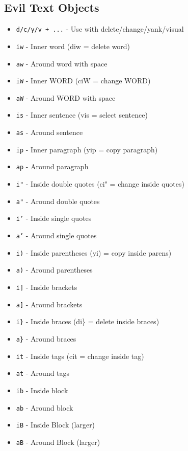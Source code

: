 \documentclass[6pt,landscape]{article}
\newcommand{\key}[1]{\texttt{#1}}
\begin{document}
\begin{multicols*}{5}
\section*{Evil Text Objects}
\begin{itemize}[leftmargin=*,itemsep=0pt,parsep=0pt,topsep=0pt]
\item \key{d/c/y/v + ...} - Use with delete/change/yank/visual
\item \key{iw} - Inner word (diw = delete word)
\item \key{aw} - Around word with space
\item \key{iW} - Inner WORD (ciW = change WORD)
\item \key{aW} - Around WORD with space
\item \key{is} - Inner sentence (vis = select sentence)
\item \key{as} - Around sentence
\item \key{ip} - Inner paragraph (yip = copy paragraph)
\item \key{ap} - Around paragraph
\item \key{i"} - Inside double quotes (ci" = change inside quotes)
\item \key{a"} - Around double quotes
\item \key{i'} - Inside single quotes
\item \key{a'} - Around single quotes
\item \key{i)} - Inside parentheses (yi) = copy inside parens)
\item \key{a)} - Around parentheses
\item \key{i]} - Inside brackets
\item \key{a]} - Around brackets
\item \key{i\}} - Inside braces (di\} = delete inside braces)
\item \key{a\}} - Around braces
\item \key{it} - Inside tags (cit = change inside tag)
\item \key{at} - Around tags
\item \key{ib} - Inside block
\item \key{ab} - Around block
\item \key{iB} - Inside Block (larger)
\item \key{aB} - Around Block (larger)
\end{itemize}


\end{multicols*}
\end{document}
